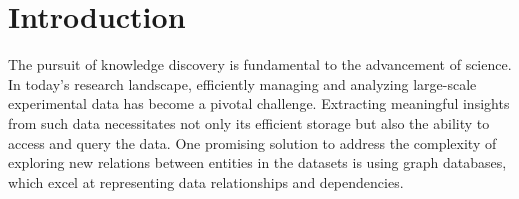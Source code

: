 \documentclass[acmsmall]{acmart}
\begin{document}




\maketitle

\section{Introduction}
\label{sec:org49148bb}
The pursuit of knowledge discovery is fundamental to the advancement of science. 
In today's research landscape, efficiently managing and analyzing large-scale experimental data has become a pivotal challenge. 
Extracting meaningful insights from such data necessitates not only its efficient storage but also the ability to access and query the data. 
One promising solution to address the complexity of exploring new relations between entities in the datasets is using graph databases, which excel at representing data relationships and dependencies.
\end{document}
